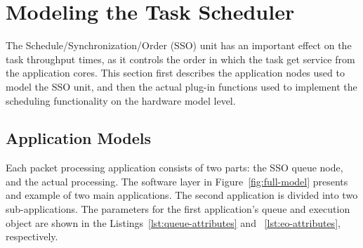 


\section{Modeling the Task Scheduler}
\label{sec:modeling-task-scheduler}

The Schedule/Synchronization/Order (SSO) unit has an important effect on the task throughput times, as it controls the order in which the task get service from the application cores. This section first describes the application nodes used to model the SSO unit, and then the actual plug-in functions used to implement the scheduling functionality on the hardware model level.








\subsection{Application Models}
\label{application-models}

Each packet processing application consists of two parts: the SSO queue node, and the actual processing. The software layer in Figure~\ref{fig:full-model} presents and example of two main applications. The second application is divided into two sub-applications. The parameters for the first application's queue and execution object are shown in the Listings~\ref{lst:queue-attributes} and ~\ref{lst:eo-attributes}, respectively.




